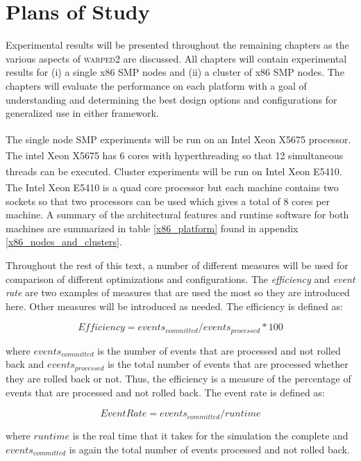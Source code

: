 \documentclass[11pt]{book}
\begin{document}
\chapter{Plans of Study}\label{plans_of_study}

Experimental results will be presented throughout the remaining chapters as the various aspects
of \textsc{warped2} are discussed.  All chapters will contain experimental results for (i) a single
x86 SMP nodes and (ii) a cluster of x86 SMP nodes.   The chapters will evaluate the performance on
each platform with a goal of understanding and determining the best design options and
configurations for generalized use in either framework.

The single node SMP experiments will be run on an Intel\textsuperscript{\textregistered}
Xeon\textsuperscript{\textregistered} X5675 processor.  The intel\textsuperscript{\textregistered}
Xeon \textsuperscript{\textregistered} X5675 has 6 cores with hyperthreading so that 12 simultaneous
threads can be executed.  Cluster experiments will be run on Intel\textsuperscript{\textregistered}
Xeon\textsuperscript{\textregistered} E5410.  The Intel\textsuperscript{\textregistered}
Xeon\textsuperscript{\textregistered} E5410 is a quad core processor but each machine contains two
sockets so that two processors can be used which gives a total of 8 cores per machine.  A summary of
the architectural features and runtime software for both machines are summarized in table
\ref{x86_platform} found in appendix \ref{x86_nodes_and_clusters}.

Throughout the rest of this text, a number of different measures will be used for comparison of
different optimizations and configurations.  The \emph{efficiency} and \emph{event rate} are two
examples of measures that are used the most so they are introduced here.  Other measures will be
introduced as needed.  The efficiency is defined as:

$$ Efficiency = {events_{committed}}/{events_{processed}} * 100 $$

\noindent
where $events_{committed}$ is the number of events that are processed and not rolled back and
$events_{processed}$ is the total number of events that are processed whether they are rolled back
or not.  Thus, the efficiency is a measure of the percentage of events that are processed and not
rolled back.  The event rate is defined as:

$$ Event Rate = {events_{committed}}/{runtime} $$

\noindent
where $runtime$ is the real time that it takes for the simulation the complete and
$events_{committed}$ is again the total number of events processed and not rolled back.
\end{document}
